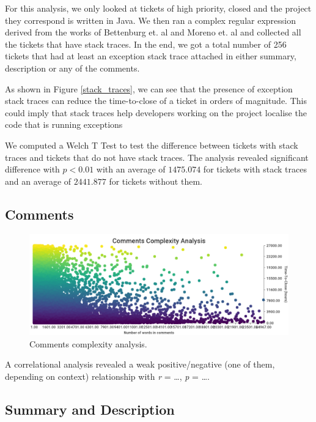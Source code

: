 \documentclass{mpaper}
\begin{document}
For this analysis, we only looked at tickets of high priority, closed and the project they correspond 
is written in Java. We then ran a complex regular expression derived from the works of Bettenburg et. al 
\cite{bettenburg2012using} and Moreno et. al \cite{moreno2014use} and collected all the tickets that have 
stack traces. In the end, we got a total number of 256 tickets that had at least an exception stack trace 
attached in either summary, description or any of the comments.

As shown in Figure \ref{stack_traces}, we can see that the presence of exception stack traces can 
reduce the time-to-close of a ticket in orders of magnitude. This could imply that stack traces help 
developers working on the project localise the code that is running exceptions 

We computed a Welch T Test to test the difference between tickets with stack traces and tickets that 
do not have stack traces. The analysis revealed significant difference with $p < 0.01$ with an
average of $1475.074$ for tickets with stack traces and an average of $2441.877$
for tickets without them.

\subsection{Comments}

\begin{figure}[ht]
  \begin{center}
    \includegraphics[scale=0.23]{images/comment_complexity.png}
  \end{center}
  \caption{\label{comments}Comments complexity analysis.}
\end{figure}

A correlational analysis revealed a weak positive/negative (one of them, depending on context) relationship
with \emph{r} = \dots, \emph{p} = \dots.


\subsection{Summary and Description}
\end{document}
